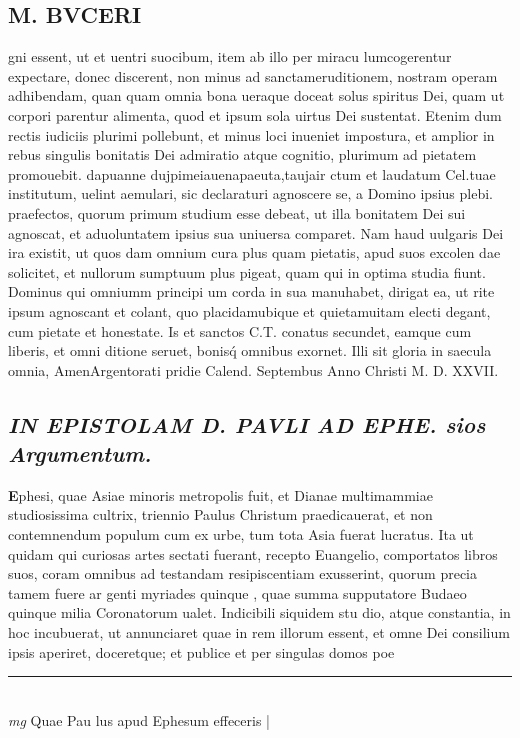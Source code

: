 \documentclass{article}
\begin{document}
\begin{pages}
\section*{M. BVCERI }\pstart gni essent, ut et uentri suocibum, item ab illo per miracu lumcogerentur expectare, donec discerent, non minus ad sanctameruditionem, nostram operam adhibendam, quan quam omnia bona ueraque doceat solus spiritus Dei, quam ut corpori parentur alimenta, quod et ipsum sola uirtus Dei sustentat. Etenim dum rectis iudiciis plurimi pollebunt, et minus loci inueniet impostura, et amplior in rebus singulis bonitatis Dei admiratio atque cognitio, plurimum ad pietatem promouebit.  \pend\pstart dapuanne dujpimeiauenapaeuta,taujair ctum et laudatum Cel.tuae institutum, uelint aemulari, sic declaraturi agnoscere se, a Domino ipsius plebi. praefectos, quorum primum studium esse debeat, ut illa bonitatem Dei sui agnoscat, et aduoluntatem ipsius sua uniuersa comparet. Nam haud uulgaris Dei ira existit, ut quos dam omnium cura plus quam pietatis, apud suos excolen dae solicitet, et nullorum sumptuum plus pigeat, quam qui in optima studia fiunt. Dominus qui omniumm principi um corda in sua manuhabet, dirigat ea, ut rite ipsum agnoscant et colant, quo placidamubique et quietamuitam electi degant, cum pietate et honestate. Is et sanctos C.T. conatus secundet, eamque cum liberis, et omni ditione seruet, bonisq́ omnibus exornet.  Illi sit gloria in saecula omnia, AmenArgentorati pridie Calend. Septembus  Anno Christi M. D. XXVII.  \pend
{}
{}
\subsection*{\textit{IN EPISTOLAM D. PAVLI AD EPHE.  sios Argumentum.  }}\pstart \huge\textbf{E}\normalsize phesi, quae Asiae minoris metropolis fuit, et Dianae multimammiae studiosissima cultrix, triennio Paulus Christum praedicauerat, et non contemnendum populum cum ex urbe, tum tota Asia fuerat lucratus. Ita ut quidam qui curiosas artes sectati fuerant, recepto Euangelio, comportatos libros suos, coram omnibus ad testandam resipiscentiam exusserint, quorum precia tamem fuere ar genti myriades quinque , quae summa supputatore Budaeo quinque milia Coronatorum ualet.  Indicibili siquidem stu dio, atque constantia, in hoc incubuerat, ut annunciaret quae in rem illorum essent, et omne Dei consilium ipsis aperiret, doceretque; et publice et per singulas domos poe\pend
\vspace{0.5cm}\noindent
\vspace{0.2cm}\rule{1cm}{0.2pt}\\ 
\hspace{0.2cm}\textit{mg}
\footnotesize Quae Pau lus apud Ephesum effeceris 
\normalsize| 

\end{pages}
\end{document}
